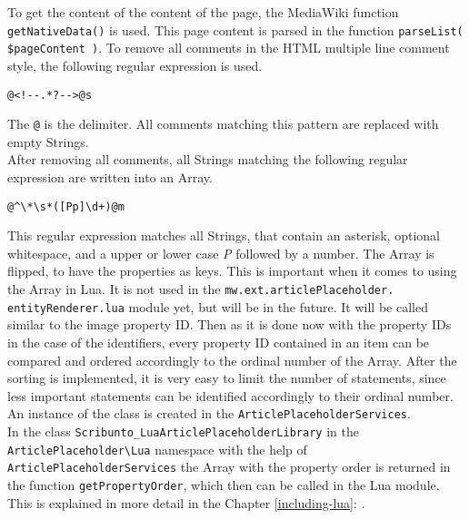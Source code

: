 To get the content of the content of the page, the MediaWiki function \texttt{\justify getNativeData()} is used. This page content is parsed in the function \texttt{\justify parseList( \$pageContent )}. To remove all comments in the HTML multiple line comment style, the following regular expression is used.
\begin{lstlisting}[frame=single]
@<!--.*?-->@s
\end{lstlisting}
The \texttt{\justify @} is the delimiter. All comments matching this pattern are replaced with empty Strings. \\
After removing all comments, all Strings matching the following regular expression are written into an Array.
\begin{lstlisting}[frame=single] 
@^\*\s*([Pp]\d+)@m
\end{lstlisting}
This regular expression matches all Strings, that contain an asterisk, optional whitespace, and a upper or lower case \textit{P} followed by a number.
The Array is flipped, to have the properties as keys. This is important when it comes to using the Array in Lua. It is not used in the \texttt{\justify mw.ext.articlePlaceholder. entityRenderer.lua} module yet, but will be in the future. It will be called similar to the image property ID. Then as it is done now with the property IDs in the case of the identifiers, every property ID contained in an item can be compared and ordered accordingly to the ordinal number of the Array.  After the sorting is implemented, it is very easy to limit the number of statements, since less important statements can be identified accordingly to their ordinal number. \\
An instance of the class is created in the \texttt{\justify ArticlePlaceholderServices}. \\
In the class \texttt{\justify Scribunto\_LuaArticlePlaceholderLibrary} in the \texttt{\justify ArticlePlaceholder\textbackslash{}Lua} namespace with the help of \texttt{\justify ArticlePlaceholderServices} the Array with the property order is returned in the function \texttt{\justify getPropertyOrder}, which then can be called in the Lua module. This is explained in more detail in the Chapter \ref{including-lua}: .
